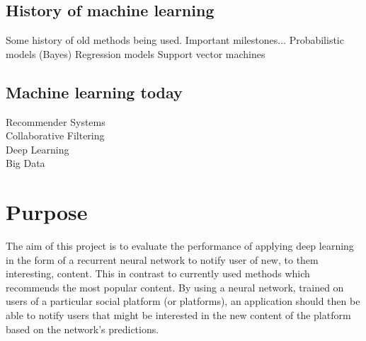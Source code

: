 \subsection{History of machine learning}%
Some history of old methods being used. Important milestones...
Probabilistic models (Bayes)
Regression models
Support vector machines

\subsection{Machine learning today} %
Recommender Systems\\
Collaborative Filtering\\
Deep Learning\\
Big Data\\

\section{Purpose}
The aim of this project is to evaluate the performance of applying deep learning in the form of a recurrent neural network to notify user of new, to them interesting, content. This in contrast to currently used methods which recommends the most popular content. By using a neural network, trained on users of a particular social platform (or platforms), an application should then be able to notify users that might be interested in the new content of the platform based on the network’s predictions. 


